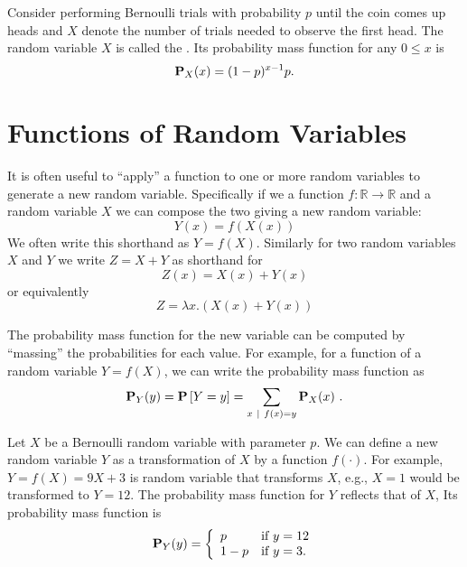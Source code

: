 \begin{gram}
Consider performing Bernoulli trials with probability $p$ until the
coin comes up heads and  $X$ denote the number of trials needed to
observe the first head. 
%
The random variable $X$ is called the .
%
Its probability mass function for any $0 \le x$ is 
%
\[
\mathbf{P}_{X}(x) = (1-p)^{x-1} p.
\]
\end{gram}

\section{Functions of Random Variables}
\label{sec:probability::randvar::functionsof}

\begin{flex}
  \begin{gram}
    It is often useful to ``apply'' a function to one or more random
    variables to generate a new random variable.   Specifically if we a
    function $f : \mathbb{R} \rightarrow \mathbb{R}$ and
    a random variable $X$ we can compose the two giving a new
    random variable:
    \[Y(x) = f(X(x)) \]
    We often write this shorthand as $Y = f(X)$.
    Similarly for two random variables $X$ and $Y$
    we write $Z = X + Y$ as shorthand for 
        \[Z(x) = X(x) + Y(x) \]
    or equivalently
        \[Z = \lambda x . (X(x) + Y(x)) \]

%
The probability mass function for the new variable can be computed by
``massing'' the probabilities for each value.
%
For example, for a function of a random variable $Y = f(X)$, we can
write the probability mass function as 
\[
\mathbf{P}_{Y}(y) = \mathbf{P}\left[{Y = y}\right] = \sum_{x ~\mid~ f(x) = y}{\mathbf{P}_{X}(x)}~.
\]
%
\end{gram}

\begin{example}
Let $X$ be a Bernoulli random variable with parameter $p$.  We can
define a new random variable $Y$ as a transformation of $X$ by a
function $f(\cdot)$.  For example, $Y = f(X) = 9X + 3$ is random
variable that transforms $X$, e.g., $X = 1$ would be transformed to $Y
= 12$.
%
The probability mass function for $Y$ reflects that of $X$,
%
Its probability mass function is 
\[
\mathbf{P}_{Y}(y) = 
\left\{
\begin{array}{ll}
p & \mbox{if}~y = 12
\\
1-p & \mbox{if}~y = 3.
\end{array}
\right.
\]


\end{example}
\end{flex}
